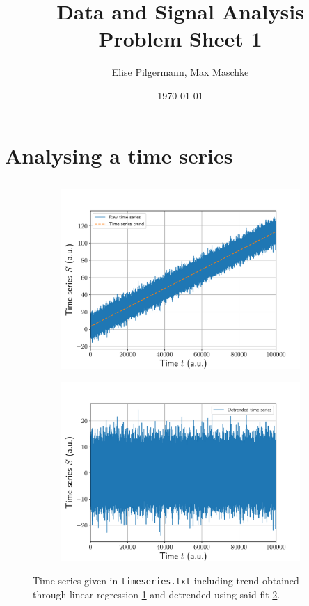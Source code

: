 \documentclass[a4paper,DIV=12,english]{scrartcl}
\title{Data and Signal Analysis\\Problem Sheet 1}
\author{Elise Pilgermann, Max Maschke}
\date{\today}
\begin{document}
\maketitle
\setcounter{section}{1}
\section{Analysing a time series}

\subsection{}
\begin{figure}
    \centering
    \begin{subfigure}{0.49\textwidth}
        \centering
        \includegraphics[width=\textwidth]{../timeseries_trend_plot.pdf}
        \caption{}
        \label{fig:ts_trend}
    \end{subfigure}
    \begin{subfigure}{0.49\textwidth}
        \centering
        \includegraphics[width=\textwidth]{../timeseries_detrended.pdf}
        \caption{}
        \label{fig:ts_detrended}
    \end{subfigure}    
    \caption{Time series given in \texttt{timeseries.txt} including trend obtained through linear regression \ref{fig:ts_trend} and detrended using said fit \ref{fig:ts_detrended}.}
    \label{fig:ts}
\end{figure}
\end{document}
